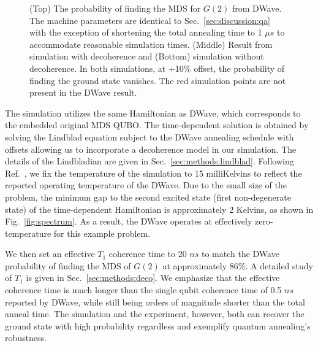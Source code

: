 \documentclass[prd,twocolumn,tightenlines,preprintnumbers,showpacs,superscriptaddress,notitlepage,nofootinbib,eqsecnum,floatfix,longbibliography]{revtex4}
\begin{document}
\begin{figure}
    \caption{ (Top) The probability of finding the MDS for $G(2)$ from DWave.
The machine parameters are identical to Sec.~\ref{sec:discussion:qa} with the exception of shortening the total annealing time to 1 $\mu s$ to accommodate reasonable simulation times.
(Middle) Result from simulation with decoherence and (Bottom) simulation without decoherence.
In both simulations, at +10\% offset, the probability of finding the ground state vanishes.
The red simulation points are not present in the DWave result.}
    \label{fig:dwave1us}
\end{figure}

The simulation utilizes the same Hamiltonian as DWave, which corresponds to the embedded original MDS QUBO.
The time-dependent solution is obtained by solving the Lindblad equation subject to the DWave annealing schedule with offsets allowing us to incorporate a decoherence model in our simulation.
The details of the Lindbladian are given in Sec.~\ref{sec:methods:lindblad}.
Following Ref.~\cite{}, we fix the temperature of the simulation to 15 milliKelvins to reflect the reported operating temperature of the DWave.
Due to the small size of the problem, the minimum gap to the second excited state (first non-degenerate state) of the time-dependent Hamiltonian is approximately 2 Kelvins, as shown in Fig.~\ref{fig:spectrum}.
As a result, the DWave operates at effectively zero-temperature for this example problem.

We then set an effective $T_1$ coherence time to 20 $ns$ to match the DWave probability of finding the MDS of $G(2)$ at approximately 86\%.
A detailed study of $T_1$ is given in Sec.~\ref{sec:methods:deco}.
We emphasize that the effective coherence time is much longer than the single qubit coherence time of 0.5 $ns$ reported by DWave, while still being orders of magnitude shorter than the total anneal time.
The simulation and the experiment, however, both can recover the ground state with high probability regardless and exemplify quantum annealing's robustness.
\end{document}
